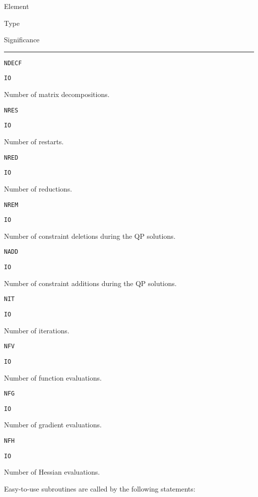 \documentclass{article}
\begin{document}
{\small

\noindent\parbox{20mm}{Element}\parbox{10mm}{$\!$Type}\parbox[t]{91mm}
  {Significance}\par\noindent\rule[1mm]{121mm}{.4pt}
  \par
\noindent\parbox{20mm}{\texttt{NDECF}}\parbox{10mm}{\texttt{IO}}\parbox[t]{91mm}{
  Number of matrix decompositions.}
  \par\vspace{2mm}
\noindent\parbox{20mm}{\texttt{NRES}}\parbox{10mm}{\texttt{IO}}\parbox[t]{91mm}{
  Number of restarts.}
  \par\vspace{2mm}
\noindent\parbox{20mm}{\texttt{NRED}}\parbox{10mm}{\texttt{IO}}\parbox[t]{91mm}{
  Number of reductions.}
  \par\vspace{2mm}
\noindent\parbox{20mm}{\texttt{NREM}}\parbox{10mm}{\texttt{IO}}\parbox[t]{91mm}{
  Number of constraint deletions during the QP solutions.}
  \par\vspace{2mm}
\noindent\parbox{20mm}{\texttt{NADD}}\parbox{10mm}{\texttt{IO}}\parbox[t]{91mm}{
  Number of constraint additions during the QP solutions.}
  \par\vspace{2mm}
\noindent\parbox{20mm}{\texttt{NIT}}\parbox{10mm}{\texttt{IO}}\parbox[t]{91mm}{
  Number of iterations.}
  \par\vspace{2mm}
\noindent\parbox{20mm}{\texttt{NFV}}\parbox{10mm}{\texttt{IO}}\parbox[t]{91mm}{
  Number of function evaluations.}
  \par\vspace{2mm}
\noindent\parbox{20mm}{\texttt{NFG}}\parbox{10mm}{\texttt{IO}}\parbox[t]{91mm}{
  Number of gradient evaluations.}
  \par\vspace{2mm}
\noindent\parbox{20mm}{\texttt{NFH}}\parbox{10mm}{\texttt{IO}}\parbox[t]{91mm}{
  Number of Hessian evaluations.}

\vspace{2mm}

}

\noindent Easy-to-use subroutines are called by the following statements:
\end{document}
